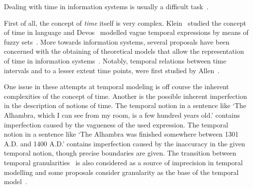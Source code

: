 Dealing with time in information systems is usually a difficult task~\cite{Bolour82}.

First of all, the concept of \emph{time} itself is very complex. Klein~\cite{klein94} studied the concept of time in language and Devos~\cite{devos94} modelled vague temporal expressions by means of fuzzy sets~\cite{zadeh65}. More towards information systems, several proposals have been concerned with the obtaining of theoretical models that allow the representation of time in information systems~\cite{Cru97}. Notably, temporal relations between time intervals and to a lesser extent time points, were first studied by Allen~\cite{Allen83}.


One issue in these attempts at temporal modeling is off course the inherent complexities of the concept of time. Another is the possible inherent imperfection in the description of notions of time. The temporal notion in a sentence like `The Alhambra, which I can see from my room, is a few hundred years old.' contains imperfection caused by the vagueness of the used expression. The temporal notion in a sentence like `The Alhambra was finished somewhere between 1301 A.D. and 1400 A.D.' contains imperfection caused by the inaccuracy in the given temporal notion, though precise boundaries are given. The transition between temporal granularities~\cite{Lin97} is also considered as a source of imprecision in temporal modelling and some proposals consider granularity as the base of the temporal model~\cite{Cru97}.


